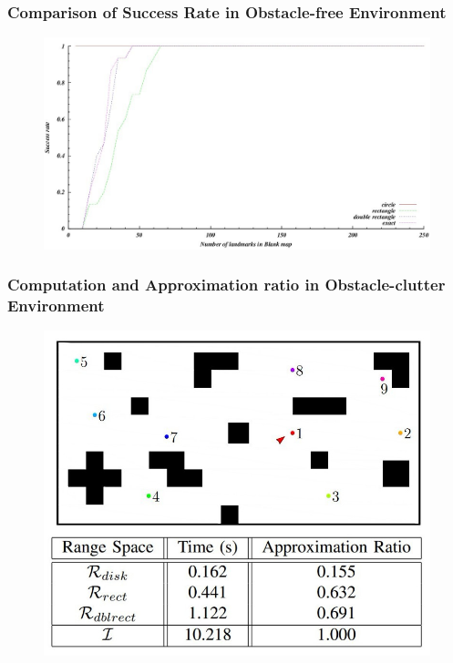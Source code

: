 \documentclass[compress]{beamer}
\begin{document}
\begin{frame} \frametitle{Comparison of Success Rate in Obstacle-free Environment}

\begin{figure}
    \includegraphics[scale=0.44]{rate-obs.jpg}
\end{figure}
\end{frame}

\begin{frame} \frametitle{Computation and Approximation ratio in Obstacle-clutter Environment}
\begin{figure}
    \includegraphics[scale=0.4]{clutter_tab.jpg}
\end{figure}
\end{frame}
\end{document}

